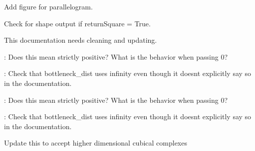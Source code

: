 
\begin{DoxyRefList}
\item[\label{todo__todo000002}%
\hypertarget{todo__todo000002}{}%
Member \hyperlink{namespaceteaspoon_1_1_m_l_1_1tents_a86c1ddf6fc99d9e3ab9cc05909983edb}{teaspoon\+:\+:ML\+:\+:tents.build\+\_\+G} (Dgms, d=10, delta=1, epsilon=0, max\+Power=1)]Add figure for parallelogram.  
\item[\label{todo__todo000001}%
\hypertarget{todo__todo000001}{}%
Member \hyperlink{namespaceteaspoon_1_1_m_l_1_1tents_a2656d1f10bf5c93cc9039a2d524c8bfd}{teaspoon\+:\+:ML\+:\+:tents.build\+\_\+\+Gm} (Dgm, d=10, delta=1, epsilon=0, return\+Square=False)]Check for shape output if return\+Square = True.  
\item[\label{todo__todo000003}%
\hypertarget{todo__todo000003}{}%
Member \hyperlink{namespaceteaspoon_1_1_t_d_a_1_1_distance_ad3481b3888962dbf302bacb9d9504e8b}{teaspoon\+:\+:T\+DA\+:\+:Distance.dgm\+Dist\+\_\+\+Hera} (D1, D2, wass\+Deg=\textquotesingle{}Bottleneck\textquotesingle{}, rel\+Error=None, internal\+\_\+p=None)]This documentation needs cleaning and updating.

\+: Does this mean strictly positive? What is the behavior when passing 0? 

\+: Check that bottleneck\+\_\+dist uses infinity even though it doesn\textquotesingle{}t explicitly say so in the documentation.

\+: Does this mean strictly positive? What is the behavior when passing 0? 

\+: Check that bottleneck\+\_\+dist uses infinity even though it doesn\textquotesingle{}t explicitly say so in the documentation. 
\item[\label{todo__todo000007}%
\hypertarget{todo__todo000007}{}%
Member \hyperlink{namespaceteaspoon_1_1_t_d_a_1_1_persistence_aa583aa9a694aeaa3983e77319ac68e84}{teaspoon\+:\+:T\+DA\+:\+:Persistence.Cubical\+\_\+\+Perseus} (M, num\+Digits=2, suppress\+Output=True)]Update this to accept higher dimensional cubical complexes 
\item[\label{todo__todo000006}%
\hypertarget{todo__todo000006}{}%
Member \hyperlink{namespaceteaspoon_1_1_t_d_a_1_1_persistence_a0660fcd00ca57001f21bfaaefb1da9c3}{teaspoon\+:\+:T\+DA\+:\+:Persistence.dist\+Mat\+\_\+\+Perseus} ()]
\end{DoxyRefList}